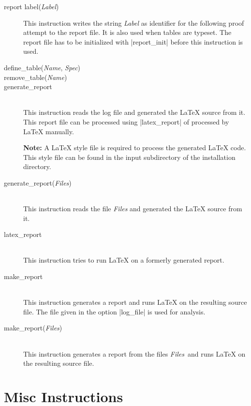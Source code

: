 \begin{description}
  \item [report label({\em Label})] This
  instruction writes the string {\em Label} as identifier for the following
  proof attempt to the report file. It is also used when tables are typeset.
  The report file has to be initialized with |report_init| before this
  instruction is used.

  \item [define\_table({\em Name}, {\em Spec})]

  \item [remove\_table({\em Name})]

  \item [generate\_report]\ \\
  This instruction reads the log file and generated the \LaTeX{} source from
  it. This report file can be processed using |latex_report| of processed by
  \LaTeX{} manually.

  {\bf Note:} A \LaTeX{} style file is required to process the generated
  \LaTeX{} code. This style file can be found in the {\sf input} subdirectory
  of the \ProTop{} installation directory.

  \item [generate\_report({\em Files})]\ \\
  This instruction reads the file {\em Files} and generated the \LaTeX{}
  source from it.

  \item [latex\_report]\ \\
  This instruction tries to run \LaTeX{} on a formerly generated report.

  \item [make\_report]\ \\
  This instruction generates a report and runs \LaTeX{} on the resulting
  source file. The file given in the option |log_file| is used for analysis.

  \item [make\_report({\em Files})]\ \\
  This instruction generates a report from the files {\em Files}\ and runs
  \LaTeX{} on the resulting source file.

\end{description}

\section{Misc Instructions}

